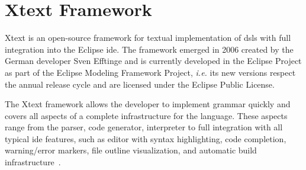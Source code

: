 \section{Xtext Framework}
\label{sec_back:xtext}

Xtext is an open-source framework for textual implementation of \acp{dsl} with full integration into the Eclipse \ac{ide}.
The framework emerged in 2006 created by the German developer Sven Efftinge and is currently developed in the Eclipse Project as part of the Eclipse Modeling Framework Project, \textit{i.e.} its new versions respect the annual release cycle and are licensed under the Eclipse Public License.

The Xtext framework allows the developer to implement grammar quickly and covers all aspects of a complete infrastructure for the language.
These aspects range from the parser, code generator, interpreter to full integration with all typical \ac{ide} features, such as editor with syntax highlighting, code completion, warning/error markers, file outline visualization, and automatic build infrastructure~\cite{Bettini:2016}.


